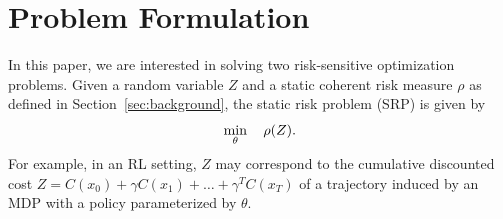 \documentclass{article} %
\begin{document}

\vspace{-0.1in}
\section{Problem Formulation}\label{sec:problem_formulation}
\vspace{-0.1in}

In this paper, we are interested in solving two risk-sensitive optimization problems. Given a random variable $Z$ and a static coherent risk measure $\rho$ as defined in Section~\ref{sec:background}, the static risk problem (SRP) is given by
%
\begin{equation}\label{eq:SRP_problem}
    \min_{\theta} \quad \rho(Z).
\end{equation}
For example, in an RL setting, $Z$ may correspond to the cumulative discounted cost $Z = C(x_0) + \gamma C(x_1) + \dots +\gamma^T C(x_{T})$ of a trajectory induced by an MDP with a policy parameterized by $\theta$.
\end{document}
